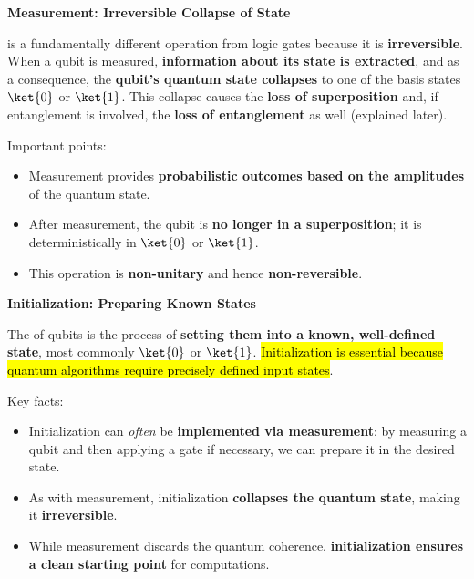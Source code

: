 \highspace
\begin{flushleft}
    \textcolor{Green3}{ \textbf{Measurement: Irreversible Collapse of State}}
\end{flushleft}
 is a fundamentally different operation from logic gates because it is \textbf{irreversible}. When a qubit is measured, \textbf{information about its state is extracted}, and as a consequence, the \textbf{qubit's quantum state collapses} to one of the basis states $\ket{0}$ or $\ket{1}$. This collapse causes the \textbf{loss of superposition} and, if entanglement is involved, the \textbf{loss of entanglement} as well (explained later).

\highspace
Important points:
\begin{itemize}
    \item Measurement provides \textbf{probabilistic outcomes based on the amplitudes} of the quantum state.
    \item After measurement, the qubit is \textbf{no longer in a superposition}; it is deterministically in $\ket{0}$ or $\ket{1}$.
    \item This operation is \textbf{non-unitary} and hence \textbf{non-reversible}.
\end{itemize}

\highspace
\begin{flushleft}
    \textcolor{Green3}{ \textbf{Initialization: Preparing Known States}}
\end{flushleft}
The  of qubits is the process of \textbf{setting them into a known, well-defined state}, most commonly $\ket{0}$ or $\ket{1}$. \hl{Initialization is essential because quantum algorithms require precisely defined input states}.

\highspace
Key facts:
\begin{itemize}
    \item Initialization can \emph{often} be \textbf{implemented via measurement}: by measuring a qubit and then applying a gate if necessary, we can prepare it in the desired state.
    \item As with measurement, initialization \textbf{collapses the quantum state}, making it \textbf{irreversible}.
    \item While measurement discards the quantum coherence, \textbf{initialization ensures a clean starting point} for computations.
\end{itemize}

